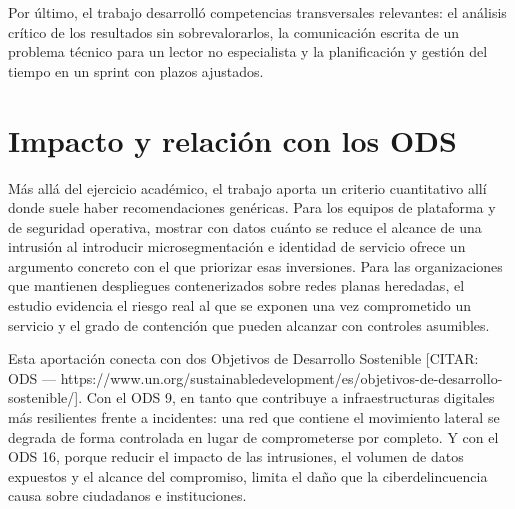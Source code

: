 \documentclass[11pt,spanish,listoffigures,listoftables]{tfgetsinf}
\begin{document}
        Por último, el trabajo desarrolló competencias transversales relevantes: el análisis crítico de los resultados sin sobrevalorarlos, la comunicación escrita de un problema técnico para un lector no especialista y la planificación y gestión del tiempo en un sprint con plazos ajustados.

        \section{Impacto y relación con los ODS}
        Más allá del ejercicio académico, el trabajo aporta un criterio cuantitativo allí donde suele haber recomendaciones genéricas. Para los equipos de plataforma y de seguridad operativa, mostrar con datos cuánto se reduce el alcance de una intrusión al introducir microsegmentación e identidad de servicio ofrece un argumento concreto con el que priorizar esas inversiones. Para las organizaciones que mantienen despliegues contenerizados sobre redes planas heredadas, el estudio evidencia el riesgo real al que se exponen una vez comprometido un servicio y el grado de contención que pueden alcanzar con controles asumibles.

        Esta aportación conecta con dos Objetivos de Desarrollo Sostenible [CITAR: ODS — https://www.un.org/sustainabledevelopment/es/objetivos-de-desarrollo-sostenible/]. Con el ODS 9, en tanto que contribuye a infraestructuras digitales más resilientes frente a incidentes: una red que contiene el movimiento lateral se degrada de forma controlada en lugar de comprometerse por completo. Y con el ODS 16, porque reducir el impacto de las intrusiones, el volumen de datos expuestos y el alcance del compromiso, limita el daño que la ciberdelincuencia causa sobre ciudadanos e instituciones.

\end{document}
